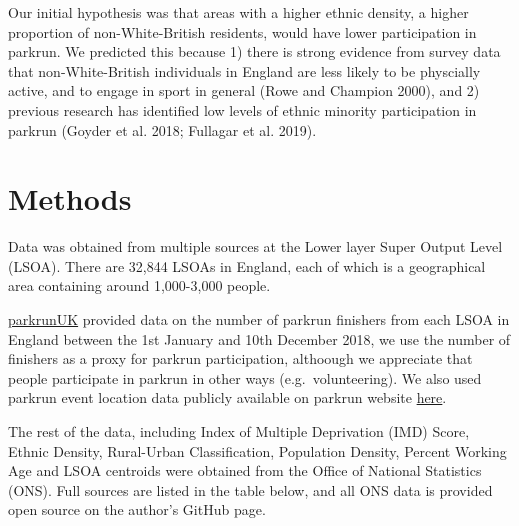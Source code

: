\documentclass[]{article}
\begin{document}
Our initial hypothesis was that areas with a higher ethnic density, a
higher proportion of non-White-British residents, would have lower
participation in parkrun. We predicted this because 1) there is strong
evidence from survey data that non-White-British individuals in England
are less likely to be physcially active, and to engage in sport in
general (Rowe and Champion 2000), and 2) previous research has
identified low levels of ethnic minority participation in parkrun
(Goyder et al. 2018; Fullagar et al. 2019).

\hypertarget{methods}{%
\section{Methods}\label{methods}}

Data was obtained from multiple sources at the Lower layer Super Output
Level (LSOA). There are 32,844 LSOAs in England, each of which is a
geographical area containing around 1,000-3,000 people.

\href{https://www.parkrun.org.uk/}{parkrunUK} provided data on the
number of parkrun finishers from each LSOA in England between the 1st
January and 10th December 2018, we use the number of finishers as a
proxy for parkrun participation, althoough we appreciate that people
participate in parkrun in other ways (e.g.~volunteering). We also used
parkrun event location data publicly available on parkrun website
\href{https://www.parkrun.org.uk/}{here}.

The rest of the data, including Index of Multiple Deprivation (IMD)
Score, Ethnic Density, Rural-Urban Classification, Population Density,
Percent Working Age and LSOA centroids were obtained from the Office of
National Statistics (ONS). Full sources are listed in the table below,
and all ONS data is provided open source on the author's GitHub page.
\end{document}
